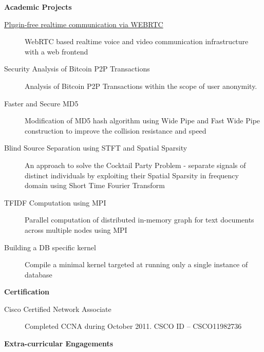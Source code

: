 \documentclass[letterpaper,11pt]{article}
\newcommand{\resheading}[1]{{\large \colorbox{mygrey}{\begin{minipage}{\textwidth}{\textbf{#1 \vphantom{p\^{E}}}}\end{minipage}}}}
\begin{document}
\newpage

\resheading{{Academic Projects}}

\begin{description}
\item[\href{https://github.com/dtsdwarak/webrtc-demo}{Plugin-free realtime communication via WEBRTC}] { \footnotesize WebRTC based realtime voice and video communication infrastructure with a web frontend}

\item[{Security Analysis of Bitcoin P2P Transactions}] { \footnotesize Analysis of Bitcoin P2P Transactions within the scope of user anonymity.}

\item[{Faster and Secure MD5}] { \footnotesize Modification of MD5 hash algorithm using Wide Pipe and Fast Wide Pipe construction to improve the collision resistance and speed}

\item[{Blind Source Separation using STFT and Spatial Sparsity}] { \footnotesize An approach to solve the Cocktail Party Problem - separate signals of distinct individuals by exploiting their Spatial Sparsity in frequency domain using Short Time Fourier Transform}

\item[{TFIDF Computation using MPI}] {\footnotesize Parallel computation of distributed in-memory graph for text documents across multiple nodes using MPI}

\item[{Building a DB specific kernel}] {\footnotesize Compile a minimal kernel targeted at running only a single instance of database}

\end{description}

\resheading{Certification}
\begin{description}

\item[Cisco Certified Network Associate] { \footnotesize Completed CCNA during October 2011. CSCO ID – CSCO11982736}

\end{description}

\resheading{Extra-curricular Engagements} 
\end{document}
